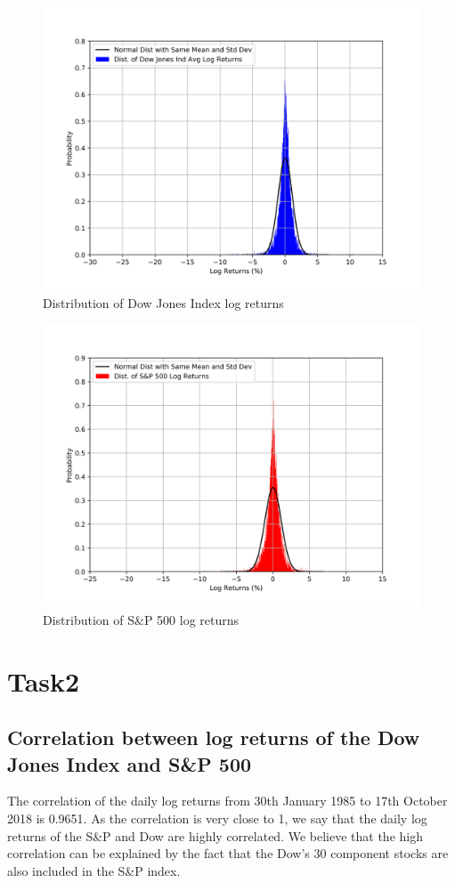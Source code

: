 \documentclass[a4paper]{article}
\begin{document}
	\begin{figure}[h!]
		\centering
		\includegraphics[width=0.8\linewidth]{DJInorm.png}
		\caption{Distribution of Dow Jones Index log returns}
	\end{figure}
	\begin{figure}[h!]
		\centering
		\includegraphics[width=0.8\linewidth]{GSPCnorm.png}
		\caption{Distribution of S\&P 500 log returns}
	\end{figure}
	
	\newpage
	\section{Task2}
	\label{sec:introduction}
	
	\subsection{Correlation between log returns of the Dow Jones Index and S\&P 500}
	The correlation of the daily log returns from 30th January 1985 to 17th October 2018 is 0.9651. As the correlation is very close to 1, we say that the daily log returns of the S\&P and Dow are highly correlated. We believe that the high correlation can be explained by the fact that the Dow’s 30 component stocks are also included in the S\&P index. 
	
\end{document}
